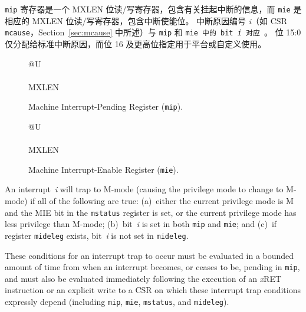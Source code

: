 {\tt mip} 寄存器是一个 MXLEN 位读/写寄存器，包含有关挂起中断的信息，而 {\tt mie} 是相应的 MXLEN 位读/写寄存器，包含中断使能位。 中断原因编号 \textit{i}（如 CSR {\tt mcause}，Section~\ref{sec:mcause} 中所述）与 {\tt mip} 和 {\tt mie 中的 bit~\textit{i} 对应 }。 位 15:0 仅分配给标准中断原因，而位 16 及更高位指定用于平台或自定义使用。

\begin{figure}[h!]
{\footnotesize
\begin{center}
\begin{tabular}{@{}U}
 \\
\hline
{} \\
\hline
MXLEN \\
\end{tabular}
\end{center}
}
\vspace{-0.1in}
\caption{Machine Interrupt-Pending Register ({\tt mip}).}
\label{mipreg}
\end{figure}

\begin{figure}[h!]
{\footnotesize
\begin{center}
\begin{tabular}{@{}U}
 \\
\hline
{} \\
\hline
MXLEN \\
\end{tabular}
\end{center}
}
\vspace{-0.1in}
\caption{Machine Interrupt-Enable Register ({\tt mie}).}
\label{miereg}
\end{figure}

\iffalse
An interrupt~\textit{i} will trap to M-mode (causing the privilege mode
to change to M-mode) if all of the following are true:
(a)~either the current privilege mode is M and the MIE bit in the
{\tt mstatus} register is set, or the current privilege mode has less
privilege than M-mode;
(b)~bit~\textit{i} is set in both {\tt mip} and {\tt mie}; and
(c)~if register {\tt mideleg} exists, bit~\textit{i} is not set in
{\tt mideleg}.

These conditions for an interrupt trap to occur must be evaluated in a bounded
amount of time from when an interrupt becomes, or ceases to be,
pending in {\tt mip}, and must
also be evaluated immediately following the execution of an {\em x}\/RET
instruction or an explicit write to a CSR on which these interrupt trap
conditions expressly depend (including {\tt mip}, {\tt mie}, {\tt mstatus},
and {\tt mideleg}).

